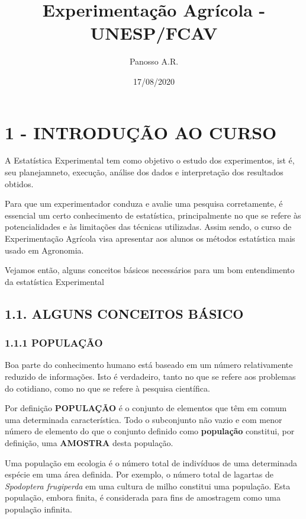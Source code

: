 \documentclass[
]{article}
\title{Experimentação Agrícola - UNESP/FCAV}
\author{Panosso A.R.}
\date{17/08/2020}
\begin{document}
\maketitle

\hypertarget{introduuxe7uxe3o-ao-curso}{%
\section{1 - INTRODUÇÃO AO CURSO}\label{introduuxe7uxe3o-ao-curso}}

A Estatística Experimental tem como objetivo o estudo dos experimentos,
ist é, seu planejamneto, execução, análise dos dados e interpretação dos
resultados obtidos.

Para que um experimentador conduza e avalie uma pesquisa corretamente, é
essencial um certo conhecimento de estatística, principalmente no que se
refere às potencialidades e às limitações das técnicas utilizadas. Assim
sendo, o curso de Experimentação Agrícola visa apresentar aos alunos os
métodos estatística mais usado em Agronomia.

Vejamos então, alguns conceitos básicos necessários para um bom
entendimento da estatística Experimental

\hypertarget{alguns-conceitos-buxe1sico}{%
\subsection{1.1. ALGUNS CONCEITOS
BÁSICO}\label{alguns-conceitos-buxe1sico}}

\hypertarget{populauxe7uxe3o}{%
\subsubsection{1.1.1 POPULAÇÃO}\label{populauxe7uxe3o}}

Boa parte do conhecimento humano está baseado em um número relativamente
reduzido de informações. Isto é verdadeiro, tanto no que se refere aos
problemas do cotidiano, como no que se refere à pesquisa científica.

Por definição \textbf{POPULAÇÃO} é o conjunto de elementos que têm em
comum uma determinada característica. Todo o subconjunto não vazio e com
menor número de elemento do que o conjunto definido como
\textbf{população} constitui, por definição, uma \textbf{AMOSTRA} desta
população.

Uma população em ecologia é o número total de indivíduos de uma
determinada espécie em uma área definida. Por exemplo, o número total de
lagartas de \emph{Spodoptera frugiperda} em uma cultura de milho
constitui uma população. Esta população, embora finita, é considerada
para fins de amostragem como uma população infinita.
\end{document}
